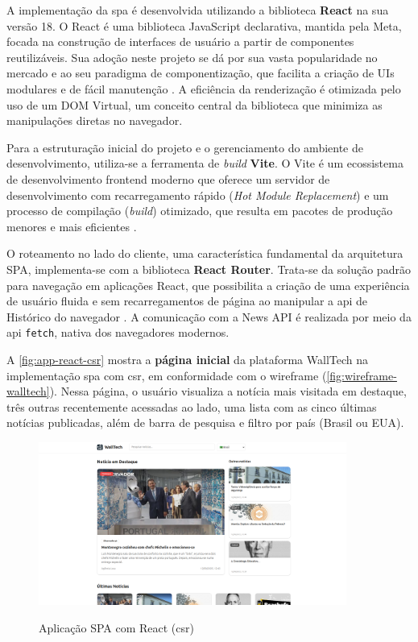 A implementação da \acrfull{spa} é desenvolvida utilizando a biblioteca \textbf{React} na sua versão 18. O React é uma biblioteca JavaScript declarativa, mantida pela Meta, focada na construção de interfaces de usuário a partir de componentes reutilizáveis. Sua adoção neste projeto se dá por sua vasta popularidade no mercado e ao seu paradigma de componentização, que facilita a criação de UIs modulares e de fácil manutenção \cite{react2025}. A eficiência da renderização é otimizada pelo uso de um DOM Virtual, um conceito central da biblioteca que minimiza as manipulações diretas no navegador.

Para a estruturação inicial do projeto e o gerenciamento do ambiente de desenvolvimento, utiliza-se a ferramenta de \textit{build} \textbf{Vite}. O Vite é um ecossistema de desenvolvimento frontend moderno que oferece um servidor de desenvolvimento com recarregamento rápido (\textit{Hot Module Replacement}) e um processo de compilação (\textit{build}) otimizado, que resulta em pacotes de produção menores e mais eficientes \cite{vite_docs}.

O roteamento no lado do cliente, uma característica fundamental da arquitetura SPA, implementa-se com a biblioteca \textbf{React Router}. Trata-se da solução padrão para navegação em aplicações React, que possibilita a criação de uma experiência de usuário fluida e sem recarregamentos de página ao manipular a \acrshort{api} de Histórico do navegador \cite{react_router_docs}. A comunicação com a News API é realizada por meio da \acrshort{api} \texttt{fetch}, nativa dos navegadores modernos.

A \autoref{fig:app-react-csr} mostra a \textbf{página inicial} da plataforma WallTech na implementação \acrshort{spa} com \acrshort{csr}, em conformidade com o wireframe (\autoref{fig:wireframe-walltech}). Nessa página, o usuário visualiza a notícia mais visitada em destaque, três outras recentemente acessadas ao lado, uma lista com as cinco últimas notícias publicadas, além de barra de pesquisa e filtro por país (Brasil ou EUA).

\begin{figure}[H]
  \centering
  \caption{Aplicação SPA com React (\acrshort{csr})}
  \includegraphics[width=0.9\textwidth]{media/app_react_csr.png}
  \label{fig:app-react-csr}
\end{figure}

